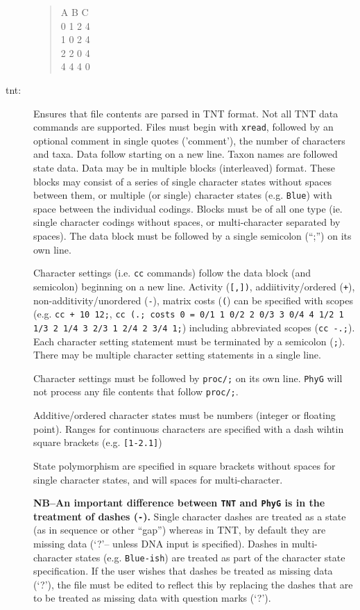 \begin{description}
			\begin{quote}
				A B C\\
				0 1 2 4\\
				1 0 2 4\\
				2 2 0 4\\
			  4 4 4 0\\
		  	 \end{quote}
  		 	  
		\item [tnt:] Ensures that file contents are parsed in TNT \citep{Goloboffetal2008} format. Not all TNT data 
		commands are supported. Files must begin with \texttt{xread}, followed by an optional comment in single 
		quotes ('comment'), the number of characters and taxa. Data follow starting on a new line. Taxon names 
		are followed state data. Data may be in multiple blocks (interleaved) format. These 	blocks may consist 
		of a series of single character states without spaces between them, or multiple (or single) character states 
		(e.g. \texttt{Blue}) with space between the individual codings. Blocks must be of all one type (ie. single 
		character codings without spaces, or multi-character separated by spaces). The data block must be followed 
		by a single semicolon (``;'') on its own line.
			
		Character settings (i.e. \texttt{cc} commands) follow the data block (and semicolon) beginning on a new line. 
		Activity (\texttt{[,])}, addiitivity/ordered (\texttt{+}), non-additivity/unordered (\texttt{-}), matrix costs (\texttt{(}) 
		can be specified with scopes (e.g. \texttt{cc + 10 12;}, \texttt{cc (.; costs 0 = 0/1 1 0/2 2 0/3 3 0/4 4 1/2 1 1/3 2 1/4 3 2/3 1 2/4 2 3/4 1;}) 
		including abbreviated scopes (\texttt{cc -.;}). Each character setting statement must be terminated by a 
		semicolon (\texttt{;}). There may be multiple character setting statements in a single line. 
		  
		Character settings must be followed by \texttt{proc/;} on its own line. \texttt{PhyG} will not process
		any file contents that follow \texttt{proc/;}.
		  
		 Additive/ordered character states must be numbers (integer or floating point). Ranges for continuous
		 characters are specified with a dash wihtin square brackets (e.g. \texttt{[1-2.1]})
		  
		 State polymorphism are specified in square brackets without spaces for
		 single character states, and will spaces for multi-character.
		  
		 \textbf{NB--An important difference between \texttt{TNT} and \texttt{PhyG} is in the treatment of dashes (\texttt{-}).} 
		 Single character dashes are treated as a state (as in sequence or other ``gap'') whereas in TNT, by default they 
		 are missing data (`?'-- unless DNA input is specified). Dashes in multi-character states (e.g. \texttt{Blue-ish}) are 
		 treated as part of the character state specification. If the user wishes that dashes be treated as missing data (`?'), 
		 the file must be edited to reflect this by replacing the dashes that are to be treated as missing data with question 
		 marks (`?').
		  

\end{description}
